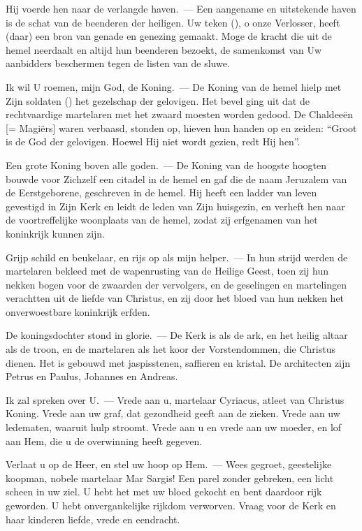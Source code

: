 \documentclass[12pt,twoside,a5paper]{article}
\begin{document}
\begin{halfparskip}
  Hij voerde hen naar de verlangde haven.~--- Een aangename en uitstekende haven is de schat van de beenderen der heiligen. Uw teken (), o onze Verlosser, heeft (daar) een bron van genade en genezing gemaakt. Moge de kracht die uit de hemel neerdaalt en altijd hun beenderen bezoekt, de samenkomst van Uw aanbidders beschermen tegen de listen van de sluwe.

  Ik wil U roemen, mijn God, de Koning.~--- De Koning van de hemel hielp met Zijn soldaten () het gezelschap der gelovigen. Het bevel ging uit dat de rechtvaardige martelaren met het zwaard moesten worden gedood. De Chaldeeën [= Magiërs] waren verbaasd, stonden op, hieven hun handen op en zeiden: ``Groot is de God der gelovigen. Hoewel Hij niet wordt gezien, redt Hij hen''.

  Een grote Koning boven alle goden.~--- De Koning van de hoogste hoogten bouwde voor Zichzelf een citadel in de hemel en gaf die de naam Jeruzalem van de Eerstgeborene, geschreven in de hemel. Hij heeft een ladder van leven gevestigd in Zijn Kerk en leidt de leden van Zijn huisgezin, en verheft hen naar de voortreffelijke woonplaats van de hemel, zodat zij erfgenamen van het koninkrijk kunnen zijn.

  Grijp schild en beukelaar, en rijs op als mijn helper.~--- In hun strijd werden de martelaren bekleed met de wapenrusting van de Heilige Geest, toen zij hun nekken bogen voor de zwaarden der vervolgers, en de geselingen en martelingen verachtten uit de liefde van Christus, en zij door het bloed van hun nekken het onverwoestbare koninkrijk erfden.

  De koningsdochter stond in glorie.~--- De Kerk is als de ark, en het heilig altaar als de troon, en de martelaren als het koor der Vorstendommen, die Christus dienen. Het is gebouwd met jaspisstenen, saffieren en kristal. De architecten zijn Petrus en Paulus, Johannes en Andreas.

  Ik zal spreken over U.~--- Vrede aan u, martelaar Cyriacus, atleet van Christus Koning. Vrede aan uw graf, dat gezondheid geeft aan de zieken. Vrede aan uw ledematen, waaruit hulp stroomt. Vrede aan u en vrede aan uw moeder, en lof aan Hem, die u de overwinning heeft gegeven.

  Verlaat u op de Heer, en stel uw hoop op Hem.~--- Wees gegroet, geestelijke koopman, nobele martelaar Mar Sargis! Een parel zonder gebreken, een licht scheen in uw ziel. U hebt het met uw bloed gekocht en bent daardoor rijk geworden. U hebt onvergankelijke rijkdom verworven. Vraag voor de Kerk en haar kinderen liefde, vrede en eendracht.


\end{halfparskip}
\end{document}
